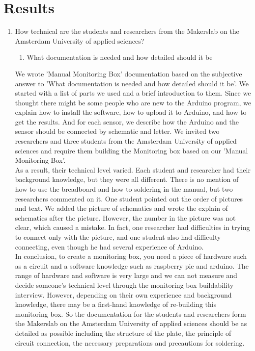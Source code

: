 \documentclass{report}
\begin{document}
\chapter{Results}
\begin{enumerate}
\item How technical are the students and researchers from the Makerslab on the Amsterdam University of applied sciences?
\begin{enumerate}
\item What documentation is needed and how detailed should it be
\end{enumerate}
 We wrote 'Manual Monitoring Box' documentation based on the subjective answer to 'What documentation is needed and how detailed should it be'. We started with a list of parts we used and a brief introduction to them. Since we thought there might be some people who are new to the Arduino program, we explain how to install the software, how to upload it to Arduino, and how to get the results. And for each sensor, we describe how the Arduino and the sensor should be connected by schematic and letter. We invited two researchers and three students from the Amsterdam University of applied sciences and require them building the Monitoring box based on our 'Manual Monitoring Box'. \\
As a result, their technical level varied. Each student and researcher had their background knowledge, but they were all different. There is no mention of how to use the breadboard and how to soldering in the manual, but two researchers commented on it. One student pointed out the order of pictures and text. We added the picture of schematics and wrote the explain of schematics after the picture. However, the number in the picture was not clear, which caused a mistake. In fact, one researcher had difficulties in trying to connect only with the picture, and one student also had difficulty connecting, even though he had several experience of Arduino.\\
In conclusion, to create a monitoring box, you need a piece of hardware such as a circuit and a software knowledge such as raspberry pie and arduino. The range of hardware and software is very large and we can not measure and decide someone's technical level through the monitoring box buildability interview. However, depending on their own experience and background knowledge, there may be a first-hand knowledge of re-building this monitoring box. So the documentation for the students and researchers form the Makerslab on the Amsterdam University of applied sciences should be as detailed as possible including the structure of the plate, the principle of circuit connection, the necessary preparations and precautions for soldering.\\
 

\end{enumerate}
\end{document}
